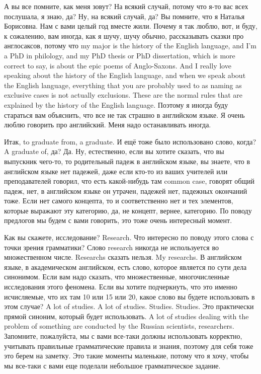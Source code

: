 \documentclass[main.tex]{subfiles}
\begin{document}
А вы все помните, как меня зовут?
На всякий случай, потому что я-то вас всех послушала, я знаю, да?
Ну, на всякий случай, да?
Вы помните, что я Наталья Борисовна.
Нам с вами целый год вместе жили.
Почему я так люблю, вот, и буду, к сожалению, вам иногда, как я шучу, шучу обычно, рассказывать сказки про англосаксов, потому что my major is the history of the English language, and I'm a PhD in philology, and my PhD thesis or PhD dissertation, which is more correct to say, is about the epic poems of Anglo-Saxons.
And I really love speaking about the history of the English language, and when we speak about the English language, everything that you are probably used to as naming as exclusive cases is not actually exclusions.
These are the normal rules that are explained by the history of the English language.
Поэтому я иногда буду стараться вам объяснить, что все не так страшно в английском языке.
Я очень люблю говорить про английский.
Меня надо останавливать иногда.

Итак, to graduate from, a graduate.
И ещё тоже было использовано слово, когда? A graduate of, да? Да.
Ну, естественно, если вы хотите сказать, что вы выпускник чего-то, то родительный падеж в английском языке, вы знаете, что в английском языке нет падежей, даже если кто-то из ваших учителей или преподавателей говорил, что есть какой-нибудь там common case, говорят общий падеж, нет, в английском языке он утрачен, падежей нет, падежных окончаний тоже.
Если нет самого концепта, то и соответственно нет и тех элементов, которые выражают эту категорию, да, не концепт, вернее, категорию.
По поводу предлогов мы будем с вами говорить, это тоже очень интересный момент.

Как вы скажете, исследование? Research.
Что интересно по поводу этого слова с точки зрения грамматики?
Слово research никогда не используется во множественном числе.
Researchs сказать нельзя.
My researchs.
В английском языке, в академическом английском, есть слово, которое является по сути дела синонимом.
Если вам надо сказать, что множественные, многочисленные исследования этого феномена.
Если вы хотите подчеркнуть, что это именно исчисляемые, что их там 10 или 15 или 20, какое слово вы будете использовать в этом случае?
A lot of studies.
A lot of studies.
Studies.
Studies.
Это практически прямой синоним, который будет использовать.
A lot of studies dealing with the problem of something are conducted by the Russian scientists, researchers.
Запомните, пожалуйста, мы с вами все-таки должны использовать корректно, учитывать правильные грамматические правила и знания, поэтому для себя тоже это берем на заметку.
Это такие моменты маленькие, потому что я хочу, чтобы мы все-таки с вами еще поделали небольшое грамматическое задание.
\end{document}
